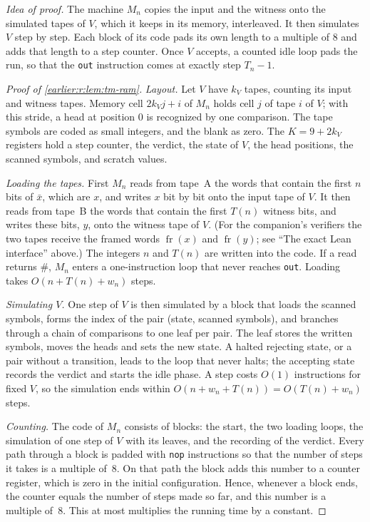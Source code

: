 \emph{Idea of proof.} The machine \(M_n\) copies the input and the
witness onto the simulated tapes of \(V\), which it keeps in its memory,
interleaved. It then simulates \(V\) step by step. Each block of its
code pads its own length to a multiple of \(8\) and adds that length to
a step counter. Once \(V\) accepts, a counted idle loop pads the run, so
that the \texttt{out} instruction comes at exactly step \(T_n-1\).

\begin{proof}[Proof of \cref{earlier:r:lem:tm-ram}]
\emph{Layout.} Let \(V\) have \(k_V\) tapes, counting its input and
witness tapes. Memory cell \(2k_Vj+i\) of \(M_n\) holds cell \(j\) of
tape \(i\) of \(V\); with this stride, a head at position \(0\) is
recognized by one comparison. The tape symbols are coded as small
integers, and the blank as zero. The \(K=9+2k_V\) registers hold a step
counter, the verdict, the state of \(V\), the head positions, the
scanned symbols, and scratch values.

\emph{Loading the tapes.} First \(M_n\) reads from tape~A the words
that contain the first \(n\) bits of \(\bar x\), which are \(x\), and
writes \(x\) bit by bit onto the input tape of \(V\). It then reads from
tape~B the words that contain the first \(T(n)\) witness bits, and writes
these bits, \(y\), onto the witness tape of \(V\). (For the companion's
verifiers the two tapes receive the framed words
\(\operatorname{fr}(x)\) and \(\operatorname{fr}(y)\); see ``The exact
Lean interface'' above.) The integers \(n\) and \(T(n)\) are written
into the code. If a read returns \(\#\), \(M_n\) enters a one-instruction
loop that never reaches \texttt{out}. Loading takes
\(O(n+T(n)+w_n)\) steps.

\emph{Simulating \(V\).} One step of \(V\) is then simulated by a block
that loads the scanned symbols, forms the index of the pair (state,
scanned symbols), and branches through a chain of comparisons to one
leaf per pair. The leaf stores the written symbols, moves the heads and
sets the new state. A halted rejecting state, or a pair without a
transition, leads to the loop that never halts; the accepting state
records the verdict and starts the idle phase. A step costs \(O(1)\)
instructions for fixed \(V\), so the simulation ends within
\(O(n+w_n+T(n))=O(T(n)+w_n)\) steps.

\emph{Counting.} The code of \(M_n\) consists of blocks: the start, the
two loading loops, the simulation of one step of \(V\) with its leaves,
and the recording of the verdict. Every path through a block is padded
with \texttt{nop} instructions so that the number of steps it takes is
a multiple of~\(8\). On that path the block adds this number to a
counter register, which is zero in the initial configuration. Hence,
whenever a block ends, the counter equals the number of steps made so
far, and this number is a multiple of~\(8\). This at most multiplies
the running time by a constant.


\end{proof}
